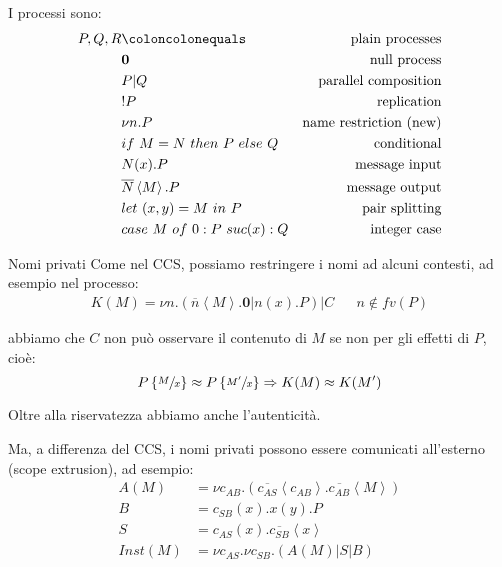 \documentclass{beamer}
\theoremstyle{plain}
\theoremstyle{definition}
\theoremstyle{remark}
\newcommand{\obar}[1]{\overline{#1}}
\newcommand{\set}[1]{\left\{#1\right\}}
\newcommand{\pa}[1]{\left(#1\right)}
\newcommand{\ang}[1]{\left<#1\right>}
\begin{document}
\begin{frame}
  I processi sono:
  \begin{align*}
    P,Q,R & \coloncolonequals & \text{plain processes} \\
          & \mathbf{0} & \text{null process} \\
          & P | Q & \text{parallel composition} \\
          & !P & \text{replication} \\
          & \nu n.P & \text{name restriction (new)} \\
          & if\ M=N\ then\ P\ else\ Q & \text{conditional} \\
          & N(x).P & \text{message input} \\
          & \obar{N}\left< M\right> .P & \text{message output} \\
          & let\ (x,y) = M\ in\ P & \text{pair splitting} \\
          & case\ M\ of\ 0: P\ suc(x): Q & \text{integer case}
  \end{align*}
\end{frame}

\begin{frame}{Nomi privati}
  Come nel CCS, possiamo restringere i nomi ad alcuni contesti, ad
  esempio nel processo:
  \begin{align*}
  K(M) = \nu n. \pa{ \obar{n}\ang{M}.\mathbf{0} | n(x).P } | C & &  n\not\in
    fv(P)
  \end{align*}
  
  abbiamo che $C$ non pu\`o osservare il contenuto di $M$ se non per gli effetti
  di $P$, cioè:
  \[ P\set{\sfrac{M}{x}} \approx P\set{\sfrac{M'}{x}} \Rightarrow K(M)
    \approx K(M') \]
  
  Oltre alla riservatezza abbiamo anche l'autenticit\`a.
\end{frame}

\begin{frame}
  Ma, a differenza del CCS, i nomi privati possono essere comunicati
  all'esterno (scope extrusion), ad esempio:
  \begin{align*}
    A(M) & = \nu
           c_{AB}. \pa{\obar{c_{AS}}\ang{c_{AB}}. \obar{c_{AB}}\ang{M}}
    \\
    B & = c_{SB}(x). x(y) .P \\
    S & = c_{AS}(x) . \obar{c_{SB}} \ang{x} \\
    Inst(M) & = \nu c_{AS}. \nu c_{SB}. \pa{ A(M) | S | B}
  \end{align*}
  \begin{center}
  \end{center}
\end{frame}
\end{document}
